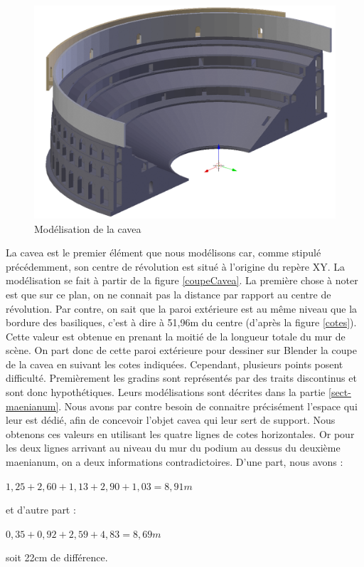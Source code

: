 \begin{figure}[!h]
	\includegraphics[width=\linewidth]{images/modCavea}
	\caption{Modélisation de la \gls{cavea}} 
	\label{modCavea} 
\end{figure} 

La \gls{cavea} est le premier élément que nous modélisons car, comme stipulé précédemment, son centre de révolution est situé à l'origine du repère XY. La modélisation se fait à partir de la figure \ref{coupeCavea}. La première chose à noter est que sur ce plan, on ne connait pas la distance par rapport au centre de révolution. Par contre, on sait que la paroi extérieure est au même niveau que la bordure des \glspl{basilique}, c'est à dire à 51,96m du centre (d'après la figure \ref{cotes}). Cette valeur est obtenue en prenant la moitié de la longueur totale du mur de scène. On part donc de cette paroi extérieure pour dessiner sur Blender la coupe de la \gls{cavea} en suivant les cotes indiquées. Cependant, plusieurs points posent difficulté. Premièrement les gradins sont représentés par des traits discontinus et sont donc hypothétiques. Leurs modélisations sont décrites dans la partie \ref{sect-maenianum}. Nous avons par contre besoin de connaitre précisément l'espace qui leur est dédié, afin de concevoir l'objet  \gls{cavea} qui leur sert de support. Nous obtenons ces valeurs en utilisant les quatre lignes de cotes horizontales. Or pour les deux lignes arrivant au niveau du mur du  \gls{podium} au dessus du deuxième \gls{maenianum}, on a deux informations contradictoires. D'une part, nous avons :
\begin{center}
$1,25+2,60+1,13+2,90+1,03=8,91m$
\end{center}
et d'autre part :
\begin{center}
$0,35+0,92+2,59+4,83=8,69m$
\end{center}
soit 22cm de différence. \\

